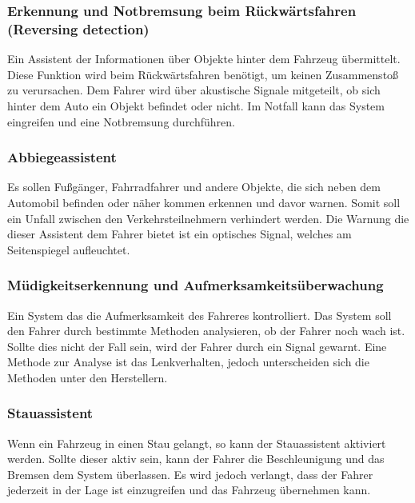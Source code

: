        \subsubsection{Erkennung und Notbremsung beim Rückwärtsfahren \newline (Reversing detection)}
        Ein Assistent der Informationen über Objekte hinter dem Fahrzeug übermittelt. Diese Funktion
        wird beim Rückwärtsfahren benötigt, um keinen Zusammenstoß zu verursachen. Dem Fahrer wird 
        über akustische Signale mitgeteilt, ob sich hinter dem Auto ein Objekt befindet oder nicht.
        Im Notfall kann das System eingreifen und eine Notbremsung durchführen.
        \cite{assistenzsysteme.PB2}  \cite{reversedetection.PB1}

        \subsubsection{Abbiegeassistent}
        Es sollen Fußgänger, Fahrradfahrer und andere Objekte, die sich neben dem Automobil befinden
        oder näher kommen erkennen und davor warnen. Somit soll ein Unfall zwischen den Verkehrsteilnehmern
        verhindert werden. Die Warnung die dieser Assistent dem Fahrer bietet ist ein optisches Signal,
        welches am Seitenspiegel aufleuchtet.
        \cite{assistenzsysteme.PB2} \cite{abbiegeassi.PB1} \cite{abbiegeassi.PB2}

        \subsubsection{Müdigkeitserkennung und Aufmerksamkeitsüberwachung}

        Ein System das die Aufmerksamkeit des Fahreres kontrolliert. Das System soll den Fahrer durch
        bestimmte Methoden analysieren, ob der Fahrer noch wach ist. Sollte dies nicht der Fall sein,
        wird der Fahrer durch ein Signal gewarnt. Eine Methode zur Analyse ist das Lenkverhalten, jedoch
        unterscheiden sich die Methoden unter den Herstellern.
        \cite{muedigkeitsassi.PB1} \cite{assistenzsysteme.PB1}  \cite{assistenzsysteme.PB2}
        \cite{muedigkeitsassi.PB2}
        
        \subsubsection{Stauassistent}
        Wenn ein Fahrzeug in einen Stau gelangt, so kann der Stauassistent aktiviert werden. Sollte dieser
        aktiv sein, kann der Fahrer die Beschleunigung und das Bremsen dem System überlassen. Es wird
        jedoch verlangt, dass der Fahrer jederzeit in der Lage ist einzugreifen und das Fahrzeug übernehmen
        kann.
        \cite{stauassi.PB1} \cite{stauassi.PB2}
        
